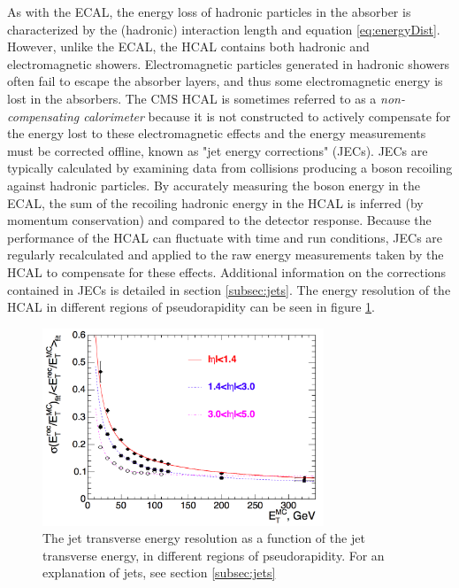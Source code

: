 As with the ECAL, the energy loss of hadronic particles in the absorber is characterized by the (hadronic) interaction length and equation \ref{eq:energyDist}. However, unlike the ECAL, the HCAL contains both hadronic and electromagnetic showers. Electromagnetic particles generated in hadronic showers  often fail to escape the absorber layers, and thus some electromagnetic energy is lost in the absorbers. The CMS HCAL is sometimes referred to as a {\it non-compensating calorimeter} because it is not constructed to actively compensate for the energy lost to these electromagnetic effects and the energy measurements must be corrected offline, known as "jet energy corrections" (JECs).  JECs are typically calculated by examining data from collisions producing a boson recoiling against  hadronic particles. By accurately measuring the boson energy in the ECAL, the sum of the recoiling hadronic energy in the HCAL is inferred (by momentum conservation) and compared to the detector response. Because the performance of the HCAL can fluctuate with time and run conditions, JECs are regularly recalculated and applied to the raw energy measurements taken by the HCAL to compensate for these effects. Additional information on the corrections contained in JECs is detailed in section \ref{subsec:jets}. The energy resolution of the HCAL in different regions of pseudorapidity can be seen in figure \ref{fig:hcalSigma}.
 \begin{figure}
	\centering
	\includegraphics[width=0.75\textwidth]{detector/figs/jetEnergyRes}
	\caption{The jet transverse energy resolution as a function of the jet transverse energy, in different regions of pseudorapidity. For an explanation of jets, see section \ref{subsec:jets}}
	\label{fig:hcalSigma}
\end{figure}

